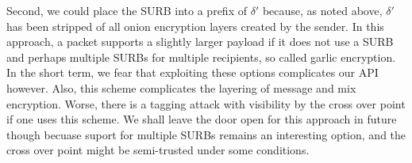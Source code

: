 Second, we could place the SURB into a prefix of $\delta'$ because,
as noted above, $\delta'$ has been stripped of all onion encryption
layers created by the sender.  In this approach, a packet supports
a slightly larger payload if it does not use a SURB and perhaps
multiple SURBs for multiple recipients, so called garlic encryption.
In the short term, we fear that exploiting these options complicates
our API however.  Also, this scheme complicates the layering of
message and mix encryption.  Worse, there is a tagging attack with
visibility by the cross over point if one uses this scheme.  We shall
leave the door open for this approach in future though becuase suport
for multiple SURBs remains an interesting option, and the cross over
point might be semi-trusted under some conditions.





